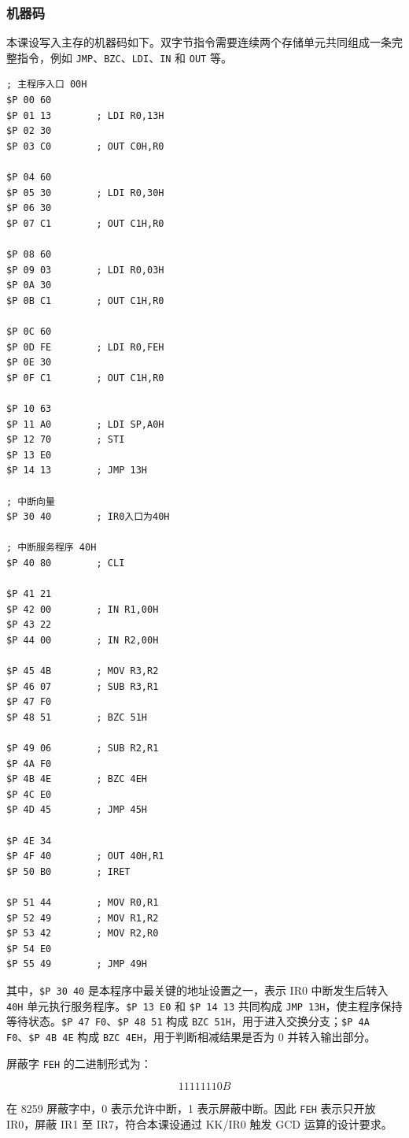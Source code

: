 \documentclass[UTF8,12pt,a4paper]{ctexart}
\newcommand{\hex}[1]{\texttt{#1H}}
\newcommand{\inst}[1]{\texttt{#1}}
\newcommand{\prog}[1]{\texttt{\$P #1}}
\begin{document}
\subsubsection{机器码}

本课设写入主存的机器码如下。双字节指令需要连续两个存储单元共同组成一条完整指令，例如 \inst{JMP}、\inst{BZC}、\inst{LDI}、\inst{IN} 和 \inst{OUT} 等。

\begin{lstlisting}
; 主程序入口 00H
$P 00 60
$P 01 13        ; LDI R0,13H
$P 02 30
$P 03 C0        ; OUT C0H,R0

$P 04 60
$P 05 30        ; LDI R0,30H
$P 06 30
$P 07 C1        ; OUT C1H,R0

$P 08 60
$P 09 03        ; LDI R0,03H
$P 0A 30
$P 0B C1        ; OUT C1H,R0

$P 0C 60
$P 0D FE        ; LDI R0,FEH
$P 0E 30
$P 0F C1        ; OUT C1H,R0

$P 10 63
$P 11 A0        ; LDI SP,A0H
$P 12 70        ; STI
$P 13 E0
$P 14 13        ; JMP 13H

; 中断向量
$P 30 40        ; IR0入口为40H

; 中断服务程序 40H
$P 40 80        ; CLI

$P 41 21
$P 42 00        ; IN R1,00H
$P 43 22
$P 44 00        ; IN R2,00H

$P 45 4B        ; MOV R3,R2
$P 46 07        ; SUB R3,R1
$P 47 F0
$P 48 51        ; BZC 51H

$P 49 06        ; SUB R2,R1
$P 4A F0
$P 4B 4E        ; BZC 4EH
$P 4C E0
$P 4D 45        ; JMP 45H

$P 4E 34
$P 4F 40        ; OUT 40H,R1
$P 50 B0        ; IRET

$P 51 44        ; MOV R0,R1
$P 52 49        ; MOV R1,R2
$P 53 42        ; MOV R2,R0
$P 54 E0
$P 55 49        ; JMP 49H
\end{lstlisting}

其中，\prog{30 40} 是本程序中最关键的地址设置之一，表示 IR0 中断发生后转入 \hex{40} 单元执行服务程序。\prog{13 E0} 和 \prog{14 13} 共同构成 \inst{JMP 13H}，使主程序保持等待状态。\prog{47 F0}、\prog{48 51} 构成 \inst{BZC 51H}，用于进入交换分支；\prog{4A F0}、\prog{4B 4E} 构成 \inst{BZC 4EH}，用于判断相减结果是否为 0 并转入输出部分。

屏蔽字 \hex{FE} 的二进制形式为：

\[
11111110B
\]

在 8259 屏蔽字中，0 表示允许中断，1 表示屏蔽中断。因此 \hex{FE} 表示只开放 IR0，屏蔽 IR1 至 IR7，符合本课设通过 KK/IR0 触发 GCD 运算的设计要求。
\end{document}
